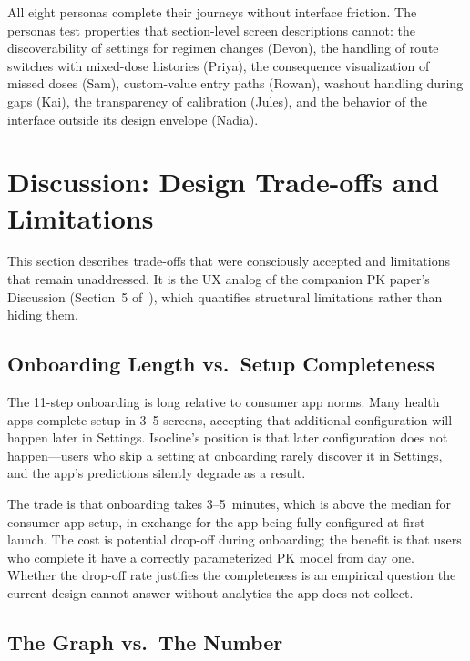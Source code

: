 \documentclass[11pt,a4paper]{article}
\begin{document}
All eight personas complete their journeys without interface friction.
The personas test properties that section-level screen descriptions
cannot: the discoverability of settings for regimen changes (Devon), the
handling of route switches with mixed-dose histories (Priya), the
consequence visualization of missed doses (Sam), custom-value entry paths
(Rowan), washout handling during gaps (Kai), the transparency of
calibration (Jules), and the behavior of the interface outside its design
envelope (Nadia).

\section{Discussion: Design Trade-offs and Limitations}
\label{sec:discussion}

This section describes trade-offs that were consciously accepted and
limitations that remain unaddressed. It is the UX analog of the companion
PK paper's Discussion (Section~5 of~\cite{xtpk}), which quantifies
structural limitations rather than hiding them.

\subsection{Onboarding Length vs.\ Setup Completeness}
\label{sec:onboarding_length}

The 11-step onboarding is long relative to consumer app norms. Many
health apps complete setup in 3--5 screens, accepting that additional
configuration will happen later in Settings. Isocline's position is that later
configuration does not happen---users who skip a setting at onboarding
rarely discover it in Settings, and the app's predictions silently degrade
as a result.

The trade is that onboarding takes 3--5~minutes, which is above the
median for consumer app setup, in exchange for the app being fully
configured at first launch. The cost is potential drop-off during
onboarding; the benefit is that users who complete it have a correctly
parameterized PK model from day one. Whether the drop-off rate justifies
the completeness is an empirical question the current design cannot
answer without analytics the app does not collect.

\subsection{The Graph vs.\ The Number}
\label{sec:graph_vs_number}
\end{document}
